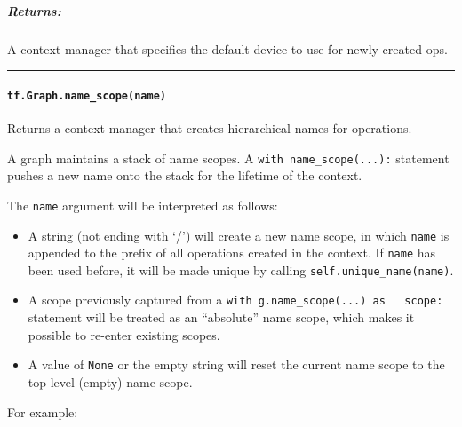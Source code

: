 \subparagraph{Returns: }\label{returns-3}

A context manager that specifies the default device to use for newly
created ops.

\begin{center}\rule{0.5\linewidth}{\linethickness}\end{center}

\paragraph{\texorpdfstring{\lstinline{tf.Graph.name_scope(name)}
}{tf.Graph.name_scope(name) }}\label{tf.graph.nameux5fscopename}

Returns a context manager that creates hierarchical names for
operations.

A graph maintains a stack of name scopes. A
\lstinline{with name_scope(...):} statement pushes a new name onto the
stack for the lifetime of the context.

The \lstinline{name} argument will be interpreted as follows:

\begin{itemize}
\tightlist
\item
  A string (not ending with `/') will create a new name scope, in which
  \lstinline{name} is appended to the prefix of all operations created in
  the context. If \lstinline{name} has been used before, it will be made
  unique by calling \lstinline{self.unique_name(name)}.
\item
  A scope previously captured from a
  \lstinline{with g.name_scope(...) as   scope:} statement will be
  treated as an ``absolute'' name scope, which makes it possible to
  re-enter existing scopes.
\item
  A value of \lstinline{None} or the empty string will reset the current
  name scope to the top-level (empty) name scope.
\end{itemize}

For example:


